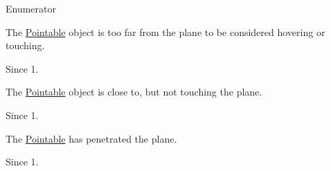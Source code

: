 \begin{Desc}
\item[Enumerator]\par
\begin{description}
\item[{\em 
\hypertarget{class_leap_1_1_pointable_ad6e50b9878b8c1fdf899b5e09721deefa4c1e87f878b5a0a3d1ac4903f92e29fe}{Z\+O\+N\+E\+\_\+\+N\+O\+N\+E}\label{class_leap_1_1_pointable_ad6e50b9878b8c1fdf899b5e09721deefa4c1e87f878b5a0a3d1ac4903f92e29fe}
}]The \hyperlink{class_leap_1_1_pointable}{Pointable} object is too far from the plane to be considered hovering or touching. \begin{DoxySince}{Since}
1. 
\end{DoxySince}
\item[{\em 
\hypertarget{class_leap_1_1_pointable_ad6e50b9878b8c1fdf899b5e09721deefad8f42b8833b8233e2b196863b5937f3c}{Z\+O\+N\+E\+\_\+\+H\+O\+V\+E\+R\+I\+N\+G}\label{class_leap_1_1_pointable_ad6e50b9878b8c1fdf899b5e09721deefad8f42b8833b8233e2b196863b5937f3c}
}]The \hyperlink{class_leap_1_1_pointable}{Pointable} object is close to, but not touching the plane. \begin{DoxySince}{Since}
1. 
\end{DoxySince}
\item[{\em 
\hypertarget{class_leap_1_1_pointable_ad6e50b9878b8c1fdf899b5e09721deefa9ccf7859ad8c4f411779d04fbdb23e23}{Z\+O\+N\+E\+\_\+\+T\+O\+U\+C\+H\+I\+N\+G}\label{class_leap_1_1_pointable_ad6e50b9878b8c1fdf899b5e09721deefa9ccf7859ad8c4f411779d04fbdb23e23}
}]The \hyperlink{class_leap_1_1_pointable}{Pointable} has penetrated the plane. \begin{DoxySince}{Since}
1. 
\end{DoxySince}
\end{description}
\end{Desc}


